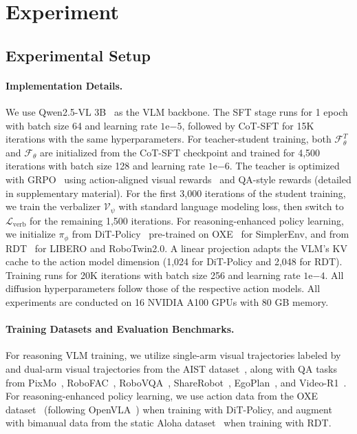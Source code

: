 \section{Experiment}
\label{sec:experiments}

\subsection{Experimental Setup}

\paragraph{Implementation Details.}

We use Qwen2.5-VL 3B~\cite{bai2025qwen2} as the VLM backbone. The SFT stage runs for 1 epoch with batch size 64 and learning rate $1\text{e}{-5}$, followed by CoT-SFT for 15K iterations with the same hyperparameters. For teacher-student training, both $\mathcal{F}_\theta^T$ and $\mathcal{F}_\theta$ are initialized from the CoT-SFT checkpoint and trained for 4,500 iterations with batch size 128 and learning rate $1\text{e}{-6}$. The teacher is optimized with GRPO~\cite{shao2024deepseekmath} using action-aligned visual rewards~\cite{huang2025thinkact} and QA-style rewards (detailed in supplementary material). For the first 3,000 iterations of the student training, we train the verbalizer $\mathcal{V}_\psi$ with standard language modeling loss, then switch to $\mathcal{L}_{\text{verb}}$ for the remaining 1,500 iterations. For reasoning-enhanced policy learning, we initialize $\pi_\phi$ from DiT-Policy~\cite{chi2023diffusion} pre-trained on OXE~\cite{o2024open} for SimplerEnv, and from RDT~\cite{liu2024rdt} for LIBERO and RoboTwin2.0. A linear projection adapts the VLM's KV cache to the action model dimension (1,024 for DiT-Policy and 2,048 for RDT). Training runs for 20K iterations with batch size 256 and learning rate $1\text{e}{-4}$. All diffusion hyperparameters follow those of the respective action models. All experiments are conducted on 16 NVIDIA A100 GPUs with 80 GB memory.


\paragraph{Training Datasets and Evaluation Benchmarks.}

For reasoning VLM training, we utilize single-arm visual trajectories labeled by~\cite{lee2025molmoact} and dual-arm visual trajectories from the AIST dataset~\cite{aist2025aist}, along with QA tasks from PixMo~\cite{deitke2024molmo}, RoboFAC~\cite{lu2025robofac}, RoboVQA~\cite{sermanet2024robovqa}, ShareRobot~\cite{ji2025robobrain}, EgoPlan~\cite{chen2023egoplan}, and Video-R1~\cite{feng2025video}. For reasoning-enhanced policy learning, we use action data from the OXE dataset~\cite{o2024open} (following OpenVLA~\cite{kim24openvla}) when training with DiT-Policy, and augment with bimanual data from the static Aloha dataset~\cite{shi2023waypoint, zhao2023learning} when training with RDT.

